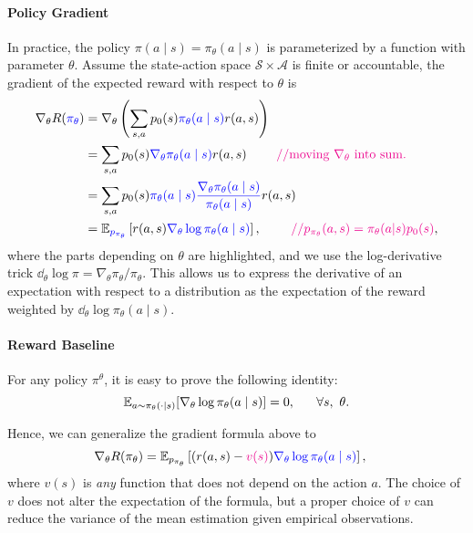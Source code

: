 \documentclass[letterpaper,11pt]{article}
\begin{document}
\paragraph{Policy Gradient} 
In practice, the policy $\pi(a \mid s) = \pi_\theta(a \mid s)$ is parameterized by a function with parameter $\theta$. 
Assume the state-action space $\mathcal S \times \mathcal A$ is finite or accountable,
the gradient of the expected reward with  respect to $\theta$ is 
\begin{align} 
\nabla_\theta R(\blue{\pi_\theta}) 
& =  \nabla_\theta \left ( \sum_{s,a} p_0(s) \blue{\pi_\theta(a \mid s)} r(a, s)  \right ) \notag \\
& = \sum_{s,a} p_0(s) \blue{\nabla_\theta \pi_\theta(a \mid s)} r(a, s) \ant{moving $\nabla_\theta$ into sum.} \notag \\ 
& = \sum_{s,a} p_0(s) \blue{\pi_\theta(a \mid s)}\blue{ \frac{ \nabla_\theta \pi_\theta(a \mid s) }{\pi_\theta(a \mid s)} } r(a, s) \notag \\
& = \E_{\blue{p_{\pi_\theta}}} \left[ r(a, s) \blue{\nabla_\theta \log \pi_\theta(a \mid s)} \right], \ant{$p_{\pi_\theta}(a,s) = \pi_\theta(a|s)p_0(s)$}, \notag %
\end{align}
where the parts depending on $\theta$ are highlighted, and we use the log-derivative trick $\dd_\theta \log \pi = \nabla_\theta \pi_\theta / \pi_\theta$. This allows us to express the derivative of an expectation with respect to a distribution as the expectation of the reward weighted by $\dd_\theta \log \pi_\theta(a \mid s)$.






\paragraph{Reward Baseline}
 For any policy $\pi^\theta$, it is easy to prove the following identity: 
 $$
 \mathbb{E}_{a\sim \pi_\theta(\cdot|s)}[\nabla_\theta \log \pi_\theta(a\mid s)] =0,~~~~~ \forall s,~\theta.  
 $$
 
Hence, we can generalize the gradient formula above to 
\begin{align} \label{equ:pcgrad2}
\nabla_\theta  R(\pi_\theta ) 
& = \mathbb{E}_{p_{\pi_\theta}}  \left [  (r(a,s) - \textcolor{magenta}{v(s)})  \textcolor{blue}{\nabla_\theta  \log  \pi_\theta (a\mid s)}  \right ],
\end{align}
where $v(s)$ is \emph{any} function that does not depend on the action $a$. 
The choice of $v$ does not alter the expectation of the formula, but a proper choice of $v$ can reduce the variance of the mean estimation given empirical observations. 
\end{document}
